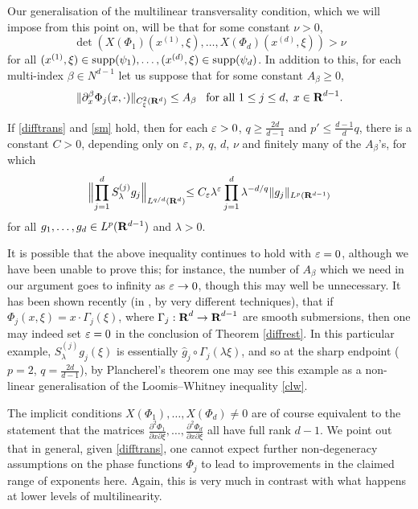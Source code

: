 Our generalisation of the multilinear transversality condition,
which we will impose from this point on, will be that for some
constant $\nu>0$,
\begin{equation}\label{difftrans}
\det\left(X(\Phi_{1})(x^{(1)},\xi),\hdots,X(\Phi_{d})(x^{(d)},\xi)\right)>\nu
\end{equation}
for all
$(x^{(1)},\xi)\in{\operatorname{supp}}(\psi_{1}),\hdots,(x^{(d)},\xi)\in{\operatorname{supp}}(\psi_{d})$.
In addition to this, for each multi-index $\beta\in N^{d-1}$ let
us suppose that for some constant $A_{\beta}\geq 0$,
\begin{equation}\label{sm}
\|\partial_{x}^{\beta}\Phi_{j}(x,\cdot)\|_{C^{2}_{\xi}({\bf R}^d)}\leq
A_{\beta}\;\;\;\mbox{for all } 1\leq j\leq d,\; x \in {\hbox{\bf R}}^{d-1}.
\end{equation}
\begin{theorem}\label{diffrest}
If \eqref{difftrans} and \eqref{sm} hold, then for each
$\varepsilon>0$, $q\geq\tfrac{2d}{d-1}$ and $p'\leq\tfrac{d-1}{d}q$,
there is a constant $C>0$, depending only on $\varepsilon$, $p$, $q$,
$d$, $\nu$ and finitely many of the $A_{\beta}$'s, for which
$$
\Bigl\|\prod_{j=1}^{d}S_{\lambda}^{(j)}g_{j}\Bigl\|_{L^{q/d}({\bf
R}^{d})} \leq
C_{\varepsilon}\lambda^{\varepsilon}\prod_{j=1}^{d}\lambda^{-d/q}\|g_{j}\|_{L^{p}({\bf
R}^{d-1})}
$$
for all $g_{1},\hdots,g_{d}\in L^{p}({\bf R}^{d-1})$ and $\lambda>
0$.
\end{theorem}
\begin{remark}\label{exglw}
It is possible that the above inequality continues to hold with
$\varepsilon=0$, although we have been unable to prove this; for instance, the number of $A_\beta$ which
we need in our argument goes to infinity as $\varepsilon \to 0$, though this may well be unnecessary.
It has been shown recently (in \cite{BCW}, by very different
techniques), that if $\Phi_{j}(x,\xi)=x\cdot\Gamma_{j}(\xi)$,
where $\Gamma_{j}:{\hbox{\bf R}}^{d}\rightarrow{\hbox{\bf R}}^{d-1}$ are smooth
submersions, then one may indeed set $\varepsilon=0$ in the
conclusion of Theorem \ref{diffrest}. In this particular example,
$S_{\lambda}^{(j)}g_{j}(\xi)$ is essentially
$\widehat{g}_{j}\circ\Gamma_{j}(\lambda\xi)$, and so at the sharp
endpoint ($p=2$, $q=\tfrac{2d}{d-1}$), by Plancherel's theorem
one may see this example as a non-linear generalisation of the
Loomis--Whitney inequality \eqref{clw}.
\end{remark}
\begin{remark}
The implicit conditions $X(\Phi_{1}),\hdots, X(\Phi_{d})\not =0$
are of course equivalent to the statement that the matrices
$\tfrac{\partial^{2}\Phi_{1}}{\partial
x\partial\xi},\hdots,\tfrac{\partial^{2}\Phi_{d}}{\partial
x\partial\xi}$ all have full rank $d-1$. We point out that in
general, given \eqref{difftrans}, one cannot expect further
non-degeneracy assumptions on the phase functions $\Phi_{j}$ to
lead to improvements in the claimed range of exponents here.
Again, this is very much in contrast with what happens at lower
levels of multilinearity.
\end{remark}

